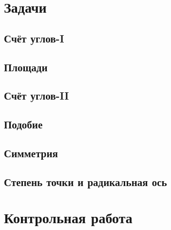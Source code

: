 \documentclass[twoside]{article}
\begin{document}
\newpage
\renewcommand{\thesubsection}{\roman{subsection}}
\setcounter{subsection}{0}

\section*{Задачи}
\subsection{Счёт углов-I}

\subsection{Площади}

\subsection{Счёт углов-II}


\subsection{Подобие}
% 
\subsection{Симметрия}
% 
\subsection{Степень точки и радикальная ось}


\newpage
{}
\section*{Контрольная работа}
% 
\end{document}
